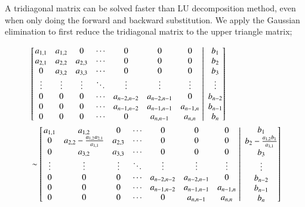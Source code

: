\documentclass[11pt,english,a4paper]{article}
\begin{document}
\begin{flushleft}
A tridiagonal matrix can be solved faster than LU decomposition method, even when only doing the forward and backward substitution. We apply the Gaussian elimination to first reduce the tridiagonal matrix to the upper triangle matrix;

\begin{align*}
&\kl{\left.\begin{matrix} a_{1,1} & a_{1,2} & 0 & \cdots & 0 & 0 & 0 \\ a_{2,1} & a_{2,2} & a_{2,3} & \cdots & 0 & 0 & 0\\ 0 & a_{3,2} & a_{3,3} & \cdots & 0 & 0 & 0\\ \vdots & \vdots & \vdots  & \ddots & \vdots & \vdots & \vdots \\ 0 & 0 & 0 & \cdots & a_{n-2,n-2} & a_{n-2,n-1} & 0 \\ 0 & 0 & 0 & \cdots & a_{n-1,n-2} & a_{n-1,n-1} & a_{n-1,n} \\ 0 & 0 & 0 &\cdots & 0 & a_{n,n-1} & a_{n,n} \end{matrix}\,\,\right\vert\,\,\begin{matrix} b_1 \\ b_2 \\ b_3 \\ \vdots \\ b_{n-2} \\ b_{n-1} \\ b_n\end{matrix}} 
\\
&\sim \kl{\left.\begin{matrix} a_{1,1} & a_{1,2} & 0 & \cdots & 0 & 0 & 0 \\ 0 & a_{2,2} - \frac{a_{1,2}a_{2,1}}{a_{1,1}} & a_{2,3} & \cdots & 0 & 0 & 0\\ 0 & a_{3,2} & a_{3,3} & \cdots & 0 & 0 & 0\\ \vdots & \vdots & \vdots  & \ddots & \vdots & \vdots & \vdots \\ 0 & 0 & 0 & \cdots & a_{n-2,n-2} & a_{n-2,n-1} & 0 \\ 0 & 0 & 0 & \cdots & a_{n-1,n-2} & a_{n-1,n-1} & a_{n-1,n} \\ 0 & 0 & 0 &\cdots & 0 & a_{n,n-1} & a_{n,n} \end{matrix}\,\,\right\vert\,\,\begin{matrix} b_1 \\ b_2 - \frac{a_{1,2} b_1}{a_{1,1}} \\ b_3 \\ \vdots \\ b_{n-2} \\ b_{n-1} \\ b_n\end{matrix}}

\end{align*}
\end{flushleft}
\end{document}
